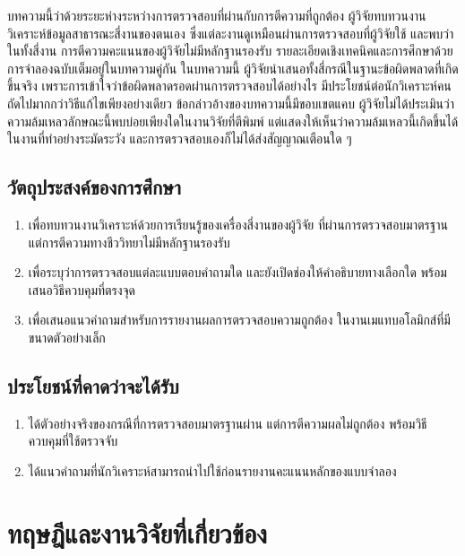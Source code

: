 \documentclass[11pt,a4paper]{article}
\begin{document}
บทความนี้ว่าด้วยระยะห่างระหว่างการตรวจสอบที่ผ่านกับการตีความที่ถูกต้อง
ผู้วิจัยทบทวนงานวิเคราะห์ข้อมูลสาธารณะสี่งานของตนเอง
ซึ่งแต่ละงานดูเหมือนผ่านการตรวจสอบที่ผู้วิจัยใช้
และพบว่าในทั้งสี่งาน การตีความคะแนนของผู้วิจัยไม่มีหลักฐานรองรับ
รายละเอียดเชิงเทคนิคและการศึกษาด้วยการจำลองฉบับเต็มอยู่ในบทความคู่กัน \cite{vyw}
ในบทความนี้ ผู้วิจัยนำเสนอทั้งสี่กรณีในฐานะข้อผิดพลาดที่เกิดขึ้นจริง
เพราะการเข้าใจว่าข้อผิดพลาดรอดผ่านการตรวจสอบได้อย่างไร
มีประโยชน์ต่อนักวิเคราะห์คนถัดไปมากกว่าวิธีแก้ไขเพียงอย่างเดียว
ข้อกล่าวอ้างของบทความนี้มีขอบเขตแคบ
ผู้วิจัยไม่ได้ประเมินว่าความล้มเหลวลักษณะนี้พบบ่อยเพียงใดในงานวิจัยที่ตีพิมพ์
แต่แสดงให้เห็นว่าความล้มเหลวนี้เกิดขึ้นได้ในงานที่ทำอย่างระมัดระวัง
และการตรวจสอบเองก็ไม่ได้ส่งสัญญาณเตือนใด ๆ

\subsection{วัตถุประสงค์ของการศึกษา}
\begin{enumerate}[label=1.2.\arabic*, leftmargin=*, labelindent=0.4cm]
  \item เพื่อทบทวนงานวิเคราะห์ด้วยการเรียนรู้ของเครื่องสี่งานของผู้วิจัย
        ที่ผ่านการตรวจสอบมาตรฐาน แต่การตีความทางชีววิทยาไม่มีหลักฐานรองรับ
  \item เพื่อระบุว่าการตรวจสอบแต่ละแบบตอบคำถามใด และยังเปิดช่องให้คำอธิบายทางเลือกใด
        พร้อมเสนอวิธีควบคุมที่ตรงจุด
  \item เพื่อเสนอแนวคำถามสำหรับการรายงานผลการตรวจสอบความถูกต้อง
        ในงานเมแทบอโลมิกส์ที่มีขนาดตัวอย่างเล็ก
\end{enumerate}

\subsection{ประโยชน์ที่คาดว่าจะได้รับ}
\begin{enumerate}[label=1.3.\arabic*, leftmargin=*, labelindent=0.4cm]
  \item ได้ตัวอย่างจริงของกรณีที่การตรวจสอบมาตรฐานผ่าน แต่การตีความผลไม่ถูกต้อง
        พร้อมวิธีควบคุมที่ใช้ตรวจจับ
  \item ได้แนวคำถามที่นักวิเคราะห์สามารถนำไปใช้ก่อนรายงานคะแนนหลักของแบบจำลอง
\end{enumerate}

\section{ทฤษฎีและงานวิจัยที่เกี่ยวข้อง}
\label{sec:lit}
\end{document}
